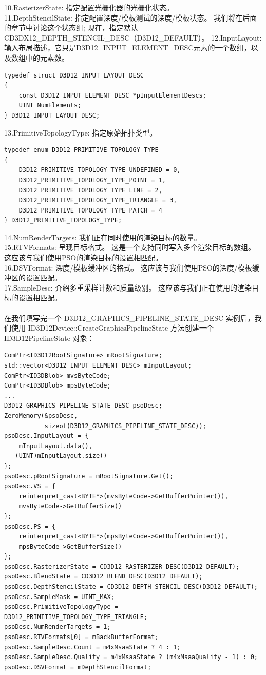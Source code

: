 \documentclass[11pt,a4paper,oldfontcommands]{memoir}
\begin{document}
{\begin{flushleft}
10.RasterizerState: 指定配置光栅化器的光栅化状态。\\
11.DepthStencilState: 指定配置深度/模板测试的深度/模板状态。 我们将在后面的章节中讨论这个状态组; 现在，指定默认CD3DX12\_DEPTH\_STENCIL\_DESC（D3D12\_DEFAULT）。
12.InputLayout: 输入布局描述，它只是D3D12\_INPUT\_ELEMENT\_DESC元素的一个数组，以及数组中的元素数。\\
\begin{lstlisting}
typedef struct D3D12_INPUT_LAYOUT_DESC
{
    const D3D12_INPUT_ELEMENT_DESC *pInputElementDescs;
    UINT NumElements;
} D3D12_INPUT_LAYOUT_DESC;
\end{lstlisting}
13.PrimitiveTopologyType: 指定原始拓扑类型。\\
\begin{lstlisting}
typedef enum D3D12_PRIMITIVE_TOPOLOGY_TYPE
{
    D3D12_PRIMITIVE_TOPOLOGY_TYPE_UNDEFINED = 0,
    D3D12_PRIMITIVE_TOPOLOGY_TYPE_POINT = 1,
    D3D12_PRIMITIVE_TOPOLOGY_TYPE_LINE = 2,
    D3D12_PRIMITIVE_TOPOLOGY_TYPE_TRIANGLE = 3,
    D3D12_PRIMITIVE_TOPOLOGY_TYPE_PATCH = 4
} D3D12_PRIMITIVE_TOPOLOGY_TYPE;
\end{lstlisting}
14.NumRenderTargets: 我们正在同时使用的渲染目标的数量。\\
15.RTVFormats: 呈现目标格式。 这是一个支持同时写入多个渲染目标的数组。 这应该与我们使用PSO的渲染目标的设置相匹配。\\
16.DSVFormat: 深度/模板缓冲区的格式。 这应该与我们使用PSO的深度/模板缓冲区的设置匹配。\\
17.SampleDesc: 介绍多重采样计数和质量级别。 这应该与我们正在使用的渲染目标的设置相匹配。\\
~\\
在我们填写完一个 D3D12\_GRAPHICS\_PIPELINE\_STATE\_DESC 实例后，我们使用 ID3D12Device::CreateGraphicsPipelineState 方法创建一个 ID3D12PipelineState 对象：\\
\begin{lstlisting}
ComPtr<ID3D12RootSignature> mRootSignature;
std::vector<D3D12_INPUT_ELEMENT_DESC> mInputLayout;
ComPtr<ID3DBlob> mvsByteCode;
ComPtr<ID3DBlob> mpsByteCode;
...
D3D12_GRAPHICS_PIPELINE_STATE_DESC psoDesc;
ZeroMemory(&psoDesc, 
           sizeof(D3D12_GRAPHICS_PIPELINE_STATE_DESC));
psoDesc.InputLayout = {
    mInputLayout.data(),
   (UINT)mInputLayout.size()
};
psoDesc.pRootSignature = mRootSignature.Get();
psoDesc.VS = {
    reinterpret_cast<BYTE*>(mvsByteCode->GetBufferPointer()),
    mvsByteCode->GetBufferSize()
};
psoDesc.PS = {
    reinterpret_cast<BYTE*>(mpsByteCode->GetBufferPointer()),
    mpsByteCode->GetBufferSize()
};
psoDesc.RasterizerState = CD3D12_RASTERIZER_DESC(D3D12_DEFAULT);
psoDesc.BlendState = CD3D12_BLEND_DESC(D3D12_DEFAULT);
psoDesc.DepthStencilState = CD3D12_DEPTH_STENCIL_DESC(D3D12_DEFAULT);
psoDesc.SampleMask = UINT_MAX;
psoDesc.PrimitiveTopologyType = D3D12_PRIMITIVE_TOPOLOGY_TYPE_TRIANGLE;
psoDesc.NumRenderTargets = 1;
psoDesc.RTVFormats[0] = mBackBufferFormat;
psoDesc.SampleDesc.Count = m4xMsaaState ? 4 : 1;
psoDesc.SampleDesc.Quality = m4xMsaaState ? (m4xMsaaQuality - 1) : 0;
psoDesc.DSVFormat = mDepthStencilFormat;


\end{lstlisting}
\end{flushleft}}
\end{document}
